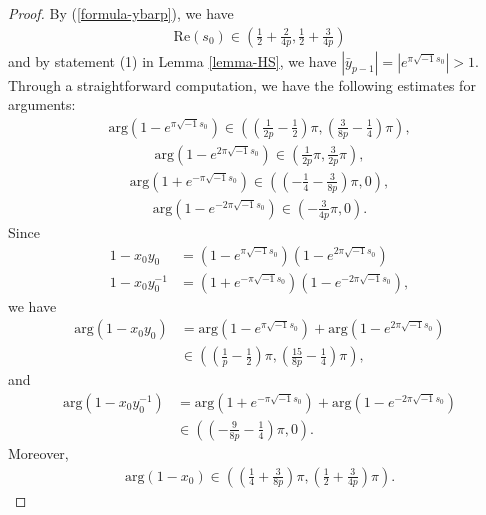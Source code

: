 \documentclass[12pt]{amsart}
\begin{document}
\begin{proof}
By (\ref{formula-ybarp}), we have
\begin{align}
\text{Re}(s_0)\in \left(\frac{1}{2}+\frac{2}{4p},\frac{1}{2}+\frac{3}{4p}\right)    
\end{align}
and by statement (1) in Lemma \ref{lemma-HS}, we have $|\bar{y}_{p-1}|=|e^{\pi\sqrt{-1}s_0}|>1$. 
Through a straightforward computation, we have the following estimates for arguments:
\begin{align}
\text{arg}(1-e^{\pi\sqrt{-1}s_0})\in \left(\left(\frac{1}{2p}-\frac{1}{2}\right)\pi,\left(\frac{3}{8p}-\frac{1}{4}\right)\pi\right),    
\end{align}
\begin{align}
 \text{arg}(1-e^{2\pi\sqrt{-1}s_0})\in \left(\frac{1}{2p}\pi,\frac{3}{2p}\pi\right),    
\end{align}
\begin{align}
\text{arg}(1+e^{-\pi\sqrt{-1}s_0})\in \left(\left(-\frac{1}{4}-\frac{3}{8p}\right)\pi,0\right),    
\end{align}
\begin{align}
    \text{arg}(1-e^{-2\pi\sqrt{-1}s_0})\in \left(-\frac{3}{4p}\pi,0\right).
\end{align}
Since
\begin{align}
1-x_0y_0&=(1-e^{\pi\sqrt{-1}s_0})(1-e^{2\pi\sqrt{-1}s_0}) \\\nonumber
1-x_0y_0^{-1}&=(1+e^{-\pi\sqrt{-1}s_0})(1-e^{-2\pi\sqrt{-1}s_0}),
\end{align}
we have 
\begin{align} \label{formula-x0y0}
\text{arg}(1-x_0y_0)&=\text{arg}(1-e^{\pi\sqrt{-1}s_0})+\text{arg}(1-e^{2\pi\sqrt{-1}s_0})\\\nonumber
&\in \left(\left(\frac{1}{p}-\frac{1}{2}\right)\pi,\left(\frac{15}{8p}-\frac{1}{4}\right)\pi\right),     
\end{align}
and 
\begin{align} \label{formula-x0y0-1}
\text{arg}(1-x_0y_0^{-1})&=\text{arg}(1+e^{-\pi\sqrt{-1}s_0})+\text{arg}(1-e^{-2\pi\sqrt{-1}s_0})\\\nonumber
&\in \left(\left(-\frac{9}{8p}-\frac{1}{4}\right)\pi,0\right).     
\end{align}
Moreover, 
\begin{align}
 \text{arg}(1-x_0)\in \left(\left(\frac{1}{4}+\frac{3}{8p}\right)\pi,\left(\frac{1}{2}+\frac{3}{4p}\right)\pi\right).   
\end{align}


\end{proof}
\end{document}
